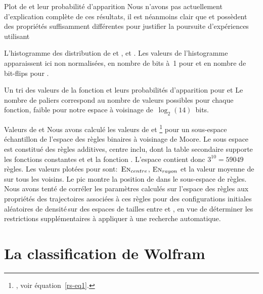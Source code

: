 %
{}%
{Plot de \protect\alambda et \protect\Flip \protect\vs leur probabilit\'e d'apparition}%
{Nous n'avons pas actuellement d'explication compl\`ete de ces
  r\'esultats, il est n\'eanmoins clair que \alambda et \Flip poss\`edent des
  propri\'et\'es suffisamment diff\'erentes pour justifier la poursuite
  d'exp\'eriences utilisant \Flip} 

%
{}%
{L'histogramme des distribution de \protect\alambda et \protect\Flip, et
  \protect\alambda \protect\vs \protect\Flip.}%
{Les valeurs de l'histogramme apparaissent ici non normalis\'ees, \ie en
  nombre de bits \`a~1 pour \alambda et en nombre de bit-flips pour
  \Flip.}

%
{}%
{Un tri des valeurs de la fonction et leurs probabilit\'es d'apparition
  pour \protect\alambda et \protect\Flip}%
{Le nombre de paliers correspond au nombre de valeurs possibles pour
  chaque fonction, faible pour notre espace \`a voisinage
  de~$\log_{2}(14)$~bits.}

%
{}%
{Valeurs de \protect\alambda et \protect\En}%
{Nous avons calcul\'e les valeurs de \alambda et \En{}\footnote{%
    , voir \'equation~\ref{rs-eq1}.} %
  pour un sous-espace \'echantillon de l'espace des r\`egles binaires \`a
  voisinage de Moore. %
  Le sous espace est constitu\'e des r\`egles additives, centre inclu, dont la table
  secondaire supporte les fonctions constantes  et
   et la fonction . %
  L'espace contient donc $3^{10} = 59049$ r\`egles. %
  Les valeurs plot\'ees pour \En sont:~$\text{\textsc{En}}_{centre}$,
  $\text{\textsc{En}}_{rayon}$ et la valeur moyenne de \En sur tous les
  voisins. %
  Le pic montre la position de  dans le sous-espace de
  r\`egles. %
  Nous avons tent\'e de corr\'eler les param\`etres calcul\'es sur l'espace des
  r\`egles aux propri\'et\'es des trajectoires associ\'ees \`a ces r\`egles pour des
  configurations initiales al\'eatoires de densit\'e\,\Sundemi sur des espaces
  de tailles entre  et , en vue de
  d\'eterminer les restrictions suppl\'ementaires \`a appliquer \`a une
  recherche automatique.}

\section{La classification de Wolfram}

